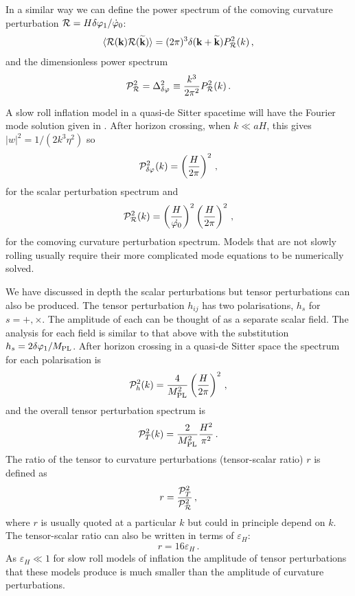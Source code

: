 In a similar way we can define the power spectrum of the comoving curvature
perturbation $\mathcal{R} = H\delta\varphi_{1}/\dot{\varphi}_0$:
% 
\begin{equation}
 \label{eq:Prdefn-intro}
 \langle \mathcal{R}(\textbf{k}) \mathcal{R}(\widetilde{\textbf{k}}) \rangle 
   = (2\pi)^3 \delta(\textbf{k} + \widetilde{\textbf{k}}) P_{\mathcal{R}}^2 (k)\,,
\end{equation}
%
and the dimensionless power spectrum
% 
\begin{equation}
 \mathcal{P}_{\mathcal{R}}^2 = \Delta^2_{\delta\varphi_{}} \equiv \frac{k^3}{2\pi^2}
P_{\mathcal{R}}^2(k)\,.
\end{equation}

A slow roll inflation model in a quasi-de Sitter spacetime will have the
Fourier mode solution given in . 
After horizon crossing, when $k\ll aH$, this gives $|w|^2 = 1/(2k^3 \eta^2)$ so 
% 
\begin{equation}
\label{eq:pphi-intro}
 \mathcal{P}_{\delta\varphi_{}}^2(k) = \left(\frac{H}{2\pi}\right)^2 \,,
\end{equation}
% 
for the scalar perturbation spectrum and
% 
\begin{equation}
 \mathcal{P}_{\mathcal{R}}^2 (k) = \left(\frac{H}{\dot{\varphi_0}}\right)^2 \left(\frac{H}{2\pi}\right)^2\,,
\end{equation}
% 
for the comoving curvature perturbation spectrum. Models that are not
slowly rolling usually require their more complicated mode equations to be
numerically solved. 

We have discussed in depth the scalar perturbations but tensor perturbations
can also be produced. The tensor perturbation $h_{ij}$
has two polarisations, $h_s$ for $s=+, \times$. The amplitude of
each can be thought of as a separate scalar field. The analysis for each field
is similar to that above with the substitution $h_s= 2\delta\varphi_{1}/M_{\mathrm{PL}}$. After horizon
crossing in a quasi-de Sitter space the spectrum for each polarisation is
% 
\begin{equation}
 \mathcal{P}_h^2(k) = \frac{4}{M_{\mathrm{PL}}^2} \left(\frac{H}{2\pi}\right)^2\,,
\end{equation}
% 
and the overall tensor perturbation spectrum is
% 
\begin{equation}
 \label{eq:Ptdefn-intro}
\mathcal{P}_T^2(k) = \frac{2}{M_{\mathrm{PL}}^2} \frac{H^2}{\pi^2}\,.
\end{equation}
The ratio of the tensor to curvature perturbations (tensor-scalar ratio) $r$ is
defined as 
% 
\begin{equation}
 r = \frac{\mathcal{P}_T^2}{\mathcal{P}_{\mathcal{R}}^2 }\,,
\end{equation}
% 
where $r$ is usually quoted at a particular $k$ but could in principle depend
on $k$. The tensor-scalar ratio can also be written in terms of $\varepsilon_H$:
% 
\begin{equation}
\label{eq:rslowroll-intro}
 r = 16 \varepsilon_H\,.
\end{equation}
As $\varepsilon_H\ll1$ for slow roll models of inflation the amplitude of tensor
perturbations that these models produce is much smaller than the amplitude of
curvature perturbations. 


